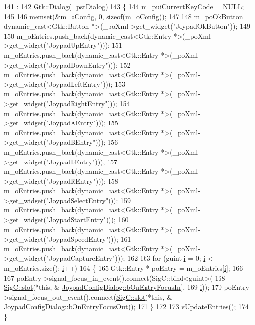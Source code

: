 \begin{DoxyCode}
141                                                                                  :
142   Gtk::Dialog(\_pstDialog)
143 \{
144   m\_puiCurrentKeyCode = \mbox{\hyperlink{getopt1_8c_a070d2ce7b6bb7e5c05602aa8c308d0c4}{NULL}};
145 
146   memset(&m\_oConfig, 0, \textcolor{keyword}{sizeof}(m\_oConfig));
147 
148   m\_poOkButton = \textcolor{keyword}{dynamic\_cast<}Gtk::Button *\textcolor{keyword}{>}(\_poXml->get\_widget(\textcolor{stringliteral}{"JoypadOkButton"}));
149 
150   m\_oEntries.push\_back(dynamic\_cast<Gtk::Entry *>(\_poXml->get\_widget(\textcolor{stringliteral}{"JoypadUpEntry"})));
151   m\_oEntries.push\_back(dynamic\_cast<Gtk::Entry *>(\_poXml->get\_widget(\textcolor{stringliteral}{"JoypadDownEntry"})));
152   m\_oEntries.push\_back(dynamic\_cast<Gtk::Entry *>(\_poXml->get\_widget(\textcolor{stringliteral}{"JoypadLeftEntry"})));
153   m\_oEntries.push\_back(dynamic\_cast<Gtk::Entry *>(\_poXml->get\_widget(\textcolor{stringliteral}{"JoypadRightEntry"})));
154   m\_oEntries.push\_back(dynamic\_cast<Gtk::Entry *>(\_poXml->get\_widget(\textcolor{stringliteral}{"JoypadAEntry"})));
155   m\_oEntries.push\_back(dynamic\_cast<Gtk::Entry *>(\_poXml->get\_widget(\textcolor{stringliteral}{"JoypadBEntry"})));
156   m\_oEntries.push\_back(dynamic\_cast<Gtk::Entry *>(\_poXml->get\_widget(\textcolor{stringliteral}{"JoypadLEntry"})));
157   m\_oEntries.push\_back(dynamic\_cast<Gtk::Entry *>(\_poXml->get\_widget(\textcolor{stringliteral}{"JoypadREntry"})));
158   m\_oEntries.push\_back(dynamic\_cast<Gtk::Entry *>(\_poXml->get\_widget(\textcolor{stringliteral}{"JoypadSelectEntry"})));
159   m\_oEntries.push\_back(dynamic\_cast<Gtk::Entry *>(\_poXml->get\_widget(\textcolor{stringliteral}{"JoypadStartEntry"})));
160   m\_oEntries.push\_back(dynamic\_cast<Gtk::Entry *>(\_poXml->get\_widget(\textcolor{stringliteral}{"JoypadSpeedEntry"})));
161   m\_oEntries.push\_back(dynamic\_cast<Gtk::Entry *>(\_poXml->get\_widget(\textcolor{stringliteral}{"JoypadCaptureEntry"})));
162 
163   \textcolor{keywordflow}{for} (guint \mbox{\hyperlink{expr-lex_8cpp_acb559820d9ca11295b4500f179ef6392}{i}} = 0; \mbox{\hyperlink{expr-lex_8cpp_acb559820d9ca11295b4500f179ef6392}{i}} < m\_oEntries.size(); \mbox{\hyperlink{expr-lex_8cpp_acb559820d9ca11295b4500f179ef6392}{i}}++)
164   \{
165     Gtk::Entry * poEntry = m\_oEntries[\mbox{\hyperlink{expr-lex_8cpp_acb559820d9ca11295b4500f179ef6392}{i}}];
166 
167     poEntry->signal\_focus\_in\_event().connect(SigC::bind<guint>(
168                                                \mbox{\hyperlink{namespace_sig_c_a92e4f19202b77e78ac1db05f5a62f6b6}{SigC::slot}}(*\textcolor{keyword}{this}, &
      \mbox{\hyperlink{class_v_b_a_1_1_joypad_config_dialog_a8be1420a4a3feee2e71bde31a2d7932d}{JoypadConfigDialog::bOnEntryFocusIn}}),
169                                                \mbox{\hyperlink{expr-lex_8cpp_acb559820d9ca11295b4500f179ef6392}{i}}));
170     poEntry->signal\_focus\_out\_event().connect(\mbox{\hyperlink{namespace_sig_c_a92e4f19202b77e78ac1db05f5a62f6b6}{SigC::slot}}(*\textcolor{keyword}{this}, &
      \mbox{\hyperlink{class_v_b_a_1_1_joypad_config_dialog_a1e8f4908a9d7c4f027d4eeee8848a984}{JoypadConfigDialog::bOnEntryFocusOut}}));
171   \}
172 
173   vUpdateEntries();
174 \}
\end{DoxyCode}

